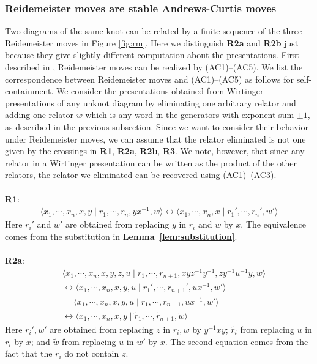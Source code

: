 \subsubsection{Reidemeister moves are stable Andrews-Curtis moves} Two diagrams of the same knot can be related by a finite sequence of the three
Reidemeister moves in Figure \ref{fig:rm}. Here we distinguish \textbf{R2a} and \textbf{R2b} just because they give slightly different computation about the presentations. First described in \cite{WADA1994241}, Reidemeister moves can be realized by (AC1)–(AC5). We list the correspondence between Reidemeister moves and (AC1)–(AC5) as follows for self-containment. We consider the presentations obtained from Wirtinger presentations of any unknot diagram by eliminating one arbitrary relator and adding one relator $w$ which is any word in the generators with exponent sum $\pm1$, as described in the previous subsection. Since we want to consider their behavior under Reidemeister moves, we can assume that the relator eliminated is not one given by the crossings in \textbf{R1}, \textbf{R2a}, \textbf{R2b}, \textbf{R3}. We note, however, that since any relator in a Wirtinger presentation can be written as the product of the other relators, the relator we eliminated can be recovered using (AC1)–(AC3).
\\
\\
\textbf{R1}:
\begin{align*}
\langle x_1,\cdots,x_n,x,y\mid r_1,\cdots,r_n,yx^{-1},w\rangle\longleftrightarrow\langle x_1,\cdots,x_n,x\mid r_1',\cdots,r_n',w'\rangle
\end{align*}
Here $r_i'$ and $w'$ are obtained from replacing $y$ in $r_i$ and $w$ by $x$. The equivalence comes from the substitution in \textbf{Lemma~\ref{lem:substitution}}.
\\
\\
\textbf{R2a}:
\begin{align*}
\,\,&\langle x_1,\cdots,x_n,x,y,z,u\mid r_1,\cdots,r_{n+1},xyz^{-1}y^{-1},zy^{-1}u^{-1}y,w\rangle
\\
&\longleftrightarrow\langle x_1,\cdots,x_n,x,y,u\mid r_1',\cdots,r_{n+1}',ux^{-1},w'\rangle
\\
&=\langle x_1,\cdots,x_n,x,y,u\mid r_1,\cdots,r_{n+1},ux^{-1},w'\rangle
\\
&\longleftrightarrow\langle x_1,\cdots,x_n,x,y\mid \tilde{r}_1,\cdots,\tilde{r}_{n+1},\tilde{w}\rangle
\end{align*}
Here $r_i',w'$ are obtained from replacing $z$ in $r_i,w$ by $y^{-1}xy$; $\tilde{r_i}$ from replacing $u$ in $r_i$ by $x$; and $\tilde{w}$ from replacing $u$ in $w'$ by $x$. The second equation comes from the fact that the $r_i$ do not contain $z$.
